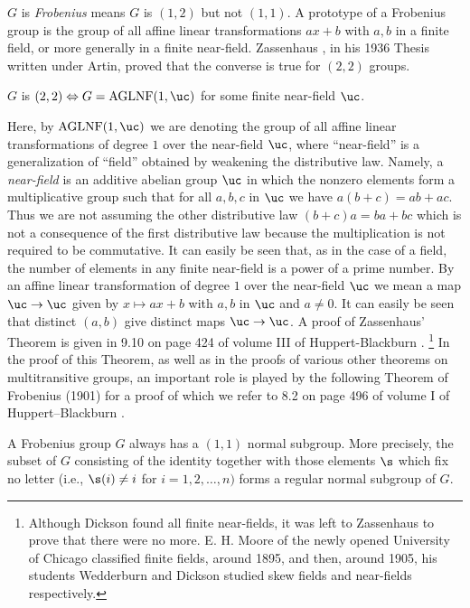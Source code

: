 $G$ is {\it Frobenius\/} means $G$ is $(1,2)$ but not 
$(1,1)$.  A 
prototype of a Frobenius group is the group of all affine 
linear 
transformations $ax + b$ with $a,b$ in a finite field, or 
more generally
in a finite near-field.  Zassenhaus \cite{Z2}, in his 1936 
Thesis written
under Artin, proved that the converse is true for $(2,2)$ 
groups.

$G$ is $(2,2) \Leftrightarrow
G = \operatorname{AGLNF}(1,\uc)$ for some finite 
near-field $\uc$.
\endproclaim 

Here, by $\operatorname{AGLNF}(1,\uc)$ we are denoting the 
group of all affine linear
transformations of degree $1$ over the near-field $\uc$, 
where 
``near-field'' is a generalization of ``field'' obtained 
by weakening the
distributive law.  Namely, a {\it near-field} is an additive
abelian group $\uc$ in which the nonzero elements form a 
multiplicative 
group such that for all $a,b,c$ in $\uc$ we have $a(b+
c)=ab+ac$.  Thus
we are not assuming the other distributive law $(b+c)a = 
ba + bc$
which is not a consequence of the first distributive law 
because the 
multiplication is not required to be commutative.  It can 
easily be 
seen that, as in the case of a field, the number of 
elements in any
finite near-field is a power of a prime number.  By an 
affine linear
transformation of degree $1$ over the near-field $\uc$ we 
mean a map
$\uc \to \uc$ given by $x \mapsto ax+b$ with $a,b$ in 
$\uc$ and $a \neq 0$.
It can easily be seen that distinct $(a,b)$ give distinct 
maps
$\uc \to \uc$.  A proof of Zassenhaus' Theorem is given in 
9.10 on page
424 of volume III of Huppert-Blackburn \cite{HB}.
\footnote{ Although Dickson found all finite near-fields, 
it was left to
Zassenhaus to prove that there were no more.  E. H. Moore 
\cite{Mo} of
the newly opened University of Chicago classified finite 
fields, around
1895, and then, around 1905, his students Wedderburn 
\cite{W} and Dickson
\cite{D2} studied skew fields and near-fields 
respectively.}  
In the proof of this Theorem, as well as in the proofs of 
various other
theorems on multitransitive groups, an important role is 
played by the
following Theorem of Frobenius (1901) \cite{Fr} for a 
proof of which we
refer to 8.2 on page 496 of volume I of Huppert--Blackburn 
\cite{HB}.

  A Frobenius group $G$ 
always has a $(1,1)$
normal subgroup.  More precisely, the subset of $G$ 
consisting of the identity
together with those elements $\s$ which fix no letter 
\RM(i.e., $\s(i) \neq i$
for $i=1,2, \dots,n)$ forms a regular normal subgroup of 
$G$.
\endproclaim

